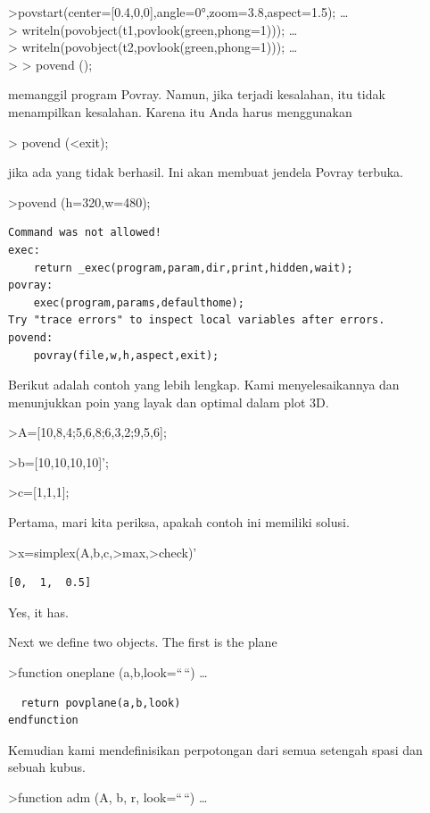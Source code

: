 \documentclass[
]{book}
\begin{document}
\textgreater povstart(center={[}0.4,0,0{]},angle=0°,zoom=3.8,aspect=1.5); \ldots{}\\
\textgreater{} writeln(povobject(t1,povlook(green,phong=1))); \ldots{}\\
\textgreater{} writeln(povobject(t2,povlook(green,phong=1))); \ldots{}\\
\textgreater{} \textgreater{} povend ();

memanggil program Povray. Namun, jika terjadi kesalahan, itu tidak menampilkan kesalahan. Karena itu Anda harus menggunakan

\textgreater{} povend (\textless exit);

jika ada yang tidak berhasil. Ini akan membuat jendela Povray terbuka.

\textgreater povend (h=320,w=480);

\begin{verbatim}
Command was not allowed!
exec:
    return _exec(program,param,dir,print,hidden,wait);
povray:
    exec(program,params,defaulthome);
Try "trace errors" to inspect local variables after errors.
povend:
    povray(file,w,h,aspect,exit); 
\end{verbatim}

Berikut adalah contoh yang lebih lengkap. Kami menyelesaikannya dan menunjukkan poin yang layak dan optimal dalam plot 3D.

\textgreater A={[}10,8,4;5,6,8;6,3,2;9,5,6{]};

\textgreater b={[}10,10,10,10{]}';

\textgreater c={[}1,1,1{]};

Pertama, mari kita periksa, apakah contoh ini memiliki solusi.

\textgreater x=simplex(A,b,c,\textgreater max,\textgreater check)'

\begin{verbatim}
[0,  1,  0.5]
\end{verbatim}

Yes, it has.

Next we define two objects. The first is the plane

\textgreater function oneplane (a,b,look=``\,``) \ldots{}

\begin{verbatim}
  return povplane(a,b,look)
endfunction
\end{verbatim}

Kemudian kami mendefinisikan perpotongan dari semua setengah spasi dan sebuah kubus.

\textgreater function adm (A, b, r, look=``\,``) \ldots{}
\end{document}
